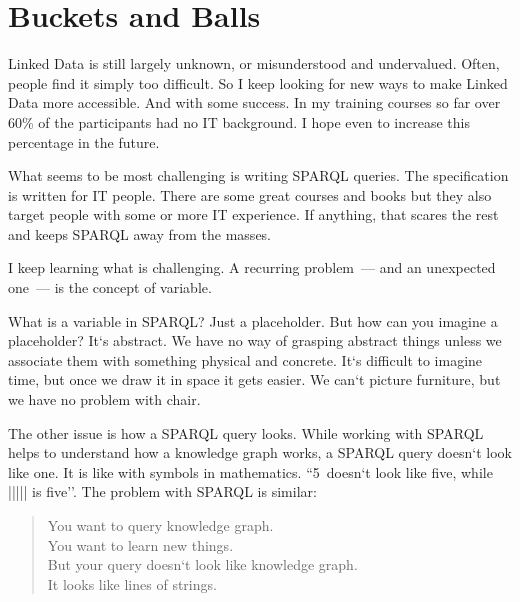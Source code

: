 
\setchapterpreamble[u]{\margintoc}
\chapter{Buckets and Balls\protect\footnotemark}


Linked Data is still largely unknown, or misunderstood and undervalued. Often, people find it simply too difficult. So I keep looking for new ways to make Linked Data more accessible. And with some success. In my training courses so far over 60\% of the participants had no IT background. I hope even to increase this percentage in the future.

What seems to be most challenging is writing SPARQL queries. The specification is written for IT people. There are some great courses and books but they also target people with some or more IT experience. If anything, that scares the rest and keeps SPARQL away from the masses.

I keep learning what is challenging. A recurring problem~--- and an unexpected one~--- is the concept of variable.

What is a variable in SPARQL? Just a placeholder. But how can you imagine a placeholder? It`s abstract. We have no way of grasping abstract things unless we associate them with something physical and concrete. It`s difficult to imagine time, but once we draw it in space it gets easier. We can`t picture furniture, but we have no problem with chair.

The other issue is how a SPARQL query looks. While working with SPARQL helps to understand how a knowledge graph works, a SPARQL query doesn`t look like one. It is like with symbols in mathematics. ``5~doesn`t look like five, while ||||| is five''. The problem with SPARQL is similar:

\begin{quote}
You want to query knowledge graph.\\
You want to learn new things.\\
But your query doesn`t look like knowledge graph.\\
It looks like lines of strings.\\
\end{quote}

